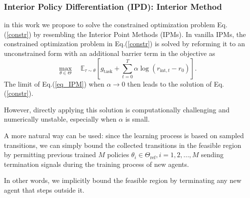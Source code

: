 \documentclass[10pt,hyperref={CJKbookmarks=true},envcountsect,mathserif]{beamer}
\begin{document}
\begin{frame}
	\frametitle{Interior Policy Differentiation (IPD): Interior Method}
	in this work we propose to solve the constrained optimization problem Eq.(\ref{constr}) by resembling the Interior Point Methods (IPMs). %
In vanilla IPMs, the constrained optimization problem in Eq.(\ref{constr}) is solved by reforming it to an unconstrained form with an additional barrier term in the objective as
\begin{equation}
\label{eq_IPM}
    \max_{\theta\in \Theta} \quad \mathbb{E}_{\tau \sim {\theta}}[g_\mathrm{task} + \sum_{t=0}^{T}\alpha\log{(r_{\mathrm{int},t} - r_0)}].
\end{equation}
The limit of Eq.(\ref{eq_IPM}) when $\alpha\rightarrow0$ then leads to the solution of Eq.(\ref{constr}). 

However, directly applying this solution is computationally challenging and numerically unstable, especially when $\alpha$ is small. 

A more natural way can be used: since the learning process is based on sampled transitions, we can simply bound the collected transitions in the feasible region by permitting previous trained $M$ policies $\theta_i \in \Theta_{\text{ref}}, i=1,2,...,M$ sending termination signals during the training process of new agents. 

In other words, we implicitly bound the feasible region by terminating any new agent that steps outside it.
\end{frame}
\end{document}
